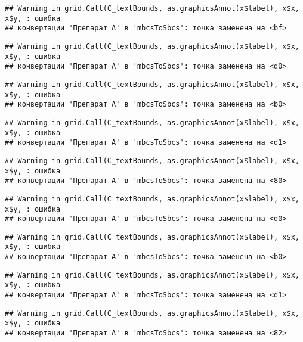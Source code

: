 \documentclass[
]{article}
\begin{document}
\begin{verbatim}
## Warning in grid.Call(C_textBounds, as.graphicsAnnot(x$label), x$x, x$y, : ошибка
## конвертации 'Препарат A' в 'mbcsToSbcs': точка заменена на <bf>
\end{verbatim}

\begin{verbatim}
## Warning in grid.Call(C_textBounds, as.graphicsAnnot(x$label), x$x, x$y, : ошибка
## конвертации 'Препарат A' в 'mbcsToSbcs': точка заменена на <d0>
\end{verbatim}

\begin{verbatim}
## Warning in grid.Call(C_textBounds, as.graphicsAnnot(x$label), x$x, x$y, : ошибка
## конвертации 'Препарат A' в 'mbcsToSbcs': точка заменена на <b0>
\end{verbatim}

\begin{verbatim}
## Warning in grid.Call(C_textBounds, as.graphicsAnnot(x$label), x$x, x$y, : ошибка
## конвертации 'Препарат A' в 'mbcsToSbcs': точка заменена на <d1>
\end{verbatim}

\begin{verbatim}
## Warning in grid.Call(C_textBounds, as.graphicsAnnot(x$label), x$x, x$y, : ошибка
## конвертации 'Препарат A' в 'mbcsToSbcs': точка заменена на <80>
\end{verbatim}

\begin{verbatim}
## Warning in grid.Call(C_textBounds, as.graphicsAnnot(x$label), x$x, x$y, : ошибка
## конвертации 'Препарат A' в 'mbcsToSbcs': точка заменена на <d0>
\end{verbatim}

\begin{verbatim}
## Warning in grid.Call(C_textBounds, as.graphicsAnnot(x$label), x$x, x$y, : ошибка
## конвертации 'Препарат A' в 'mbcsToSbcs': точка заменена на <b0>
\end{verbatim}

\begin{verbatim}
## Warning in grid.Call(C_textBounds, as.graphicsAnnot(x$label), x$x, x$y, : ошибка
## конвертации 'Препарат A' в 'mbcsToSbcs': точка заменена на <d1>
\end{verbatim}

\begin{verbatim}
## Warning in grid.Call(C_textBounds, as.graphicsAnnot(x$label), x$x, x$y, : ошибка
## конвертации 'Препарат A' в 'mbcsToSbcs': точка заменена на <82>
\end{verbatim}
\end{document}
